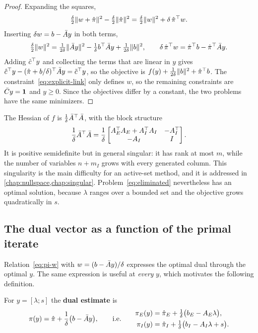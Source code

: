 \begin{proof}
Expanding the squares,
\[
\tfrac{\delta}{2}\lVert w + \hat{\pi}\rVert^2 - \tfrac{\delta}{2}\lVert\hat{\pi}\rVert^2
= \tfrac{\delta}{2}\lVert w\rVert^2 + \delta\,\hat{\pi}^\top w .
\]
Inserting $\delta w = b - \bar{A} y$ in both terms,
\[
\tfrac{\delta}{2}\lVert w\rVert^2 = \tfrac{1}{2\delta}\lVert\bar{A} y\rVert^2 - \tfrac{1}{\delta}b^\top\bar{A} y
  + \tfrac{1}{2\delta}\lVert b\rVert^2,\qquad
\delta\,\hat{\pi}^\top w = \hat{\pi}^\top b - \hat{\pi}^\top\bar{A} y .
\]
Adding $\hat{c}^\top y$ and collecting the terms that are linear in $y$ gives
$\hat{c}^\top y - (\hat{\pi} + b/\delta)^\top\bar{A} y = \tilde{c}^\top y$, so the objective is
$f(y) + \frac{1}{2\delta}\lVert b\rVert^2 + \hat{\pi}^\top b$. The constraint~\eqref{eq:explicit-link}
only defines $w$, so the remaining constraints are $\bar{C} y = \mathbf{1}$ and $y\ge0$. Since the
objectives differ by a constant, the two problems have the same minimizers.
\end{proof}

The Hessian of $f$ is $\frac{1}{\delta}\bar{A}^\top\bar{A}$, with the block structure
\begin{equation} \label{eq:hessian-blocks}
\frac{1}{\delta}\bar{A}^\top\bar{A}
= \frac{1}{\delta}\begin{bmatrix} A_E^\top A_E + A_I^\top A_I & -A_I^\top\\ -A_I & I\end{bmatrix}.
\end{equation}
It is positive semidefinite but in general singular: it has rank at most $m$, while the
number of variables $n + m_I$ grows with every generated column. This singularity is the main
difficulty for an active-set method, and it is addressed in
\cref{chap:nullspace,chap:singular}. Problem~\eqref{eq:eliminated} nevertheless has an
optimal solution, because $\lambda$ ranges over a bounded set and the objective grows
quadratically in $s$.

\subsection{The dual vector as a function of the primal iterate}

Relation~\eqref{eq:pi-w} with $w = (b-\bar{A} y)/\delta$ expresses the optimal dual through the
optimal $y$. The same expression is useful at \emph{every} $y$, which motivates the following
definition.

\begin{definition} \label{def:dual-estimate}
For $y = [\lambda; s]$ the \textbf{dual estimate} is
\begin{equation} \label{eq:pi-of-y}
\pi(y) = \hat{\pi} + \frac{1}{\delta}\bigl(b - \bar{A} y\bigr),
\qquad\text{i.e.}\qquad
\begin{aligned}
\pi_E(y) &= \hat{\pi}_E + \tfrac{1}{\delta}\bigl(b_E - A_E\lambda\bigr),\\
\pi_I(y) &= \hat{\pi}_I + \tfrac{1}{\delta}\bigl(b_I - A_I\lambda + s\bigr).
\end{aligned}
\end{equation}
\end{definition}

